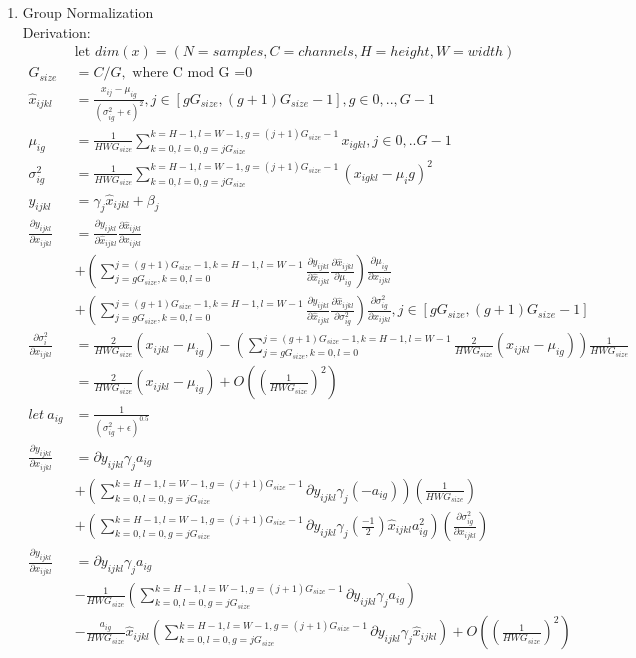 \documentclass[12pt,letter]{article}
\begin{document}
\begin{enumerate}
\item Group Normalization\\
  Derivation:
  \begin{align*}
    &\text{let } dim(x) = (N=samples,C=channels,H=height,W=width)\\
    G_{size} &= C/G, \text{ where C mod G =0}\\
    \hat{x}_{ijkl}&=\frac{x_{ij}-\mu_{ig}}{(\sigma_{ig}^2+\epsilon)^2}, j \in [gG_{size}, (g+1)G_{size}-1], g \in 0,..,G-1\\
    \mu_{ig}&=\frac{1}{HWG_{size}}\sum_{k=0,l=0,g=jG_{size}}^{k=H-1,l=W-1,g=(j+1)G_{size}-1} x_{igkl}, j \in 0,..G-1\\
    \sigma_{ig}^2&=\frac{1}{HWG_{size}}\sum_{k=0,l=0,g=jG_{size}}^{k=H-1,l=W-1,g=(j+1)G_{size}-1} (x_{igkl}-\mu_ig)^2\\
    y_{ijkl}&=\gamma_j \hat{x}_{ijkl} + \beta_j\\
    \frac{\partial y_{ijkl}}{\partial x_{ijkl}}&=\frac{\partial y_{ijkl}}{\partial \hat{x}_{ijkl}} \frac{\partial \hat{x}_{ijkl}}{\partial x_{ijkl}}\\
    & + (\sum_{j=gG_{size},k=0,l=0}^{j=(g+1)G_{size}-1,k=H-1,l=W-1} \frac{\partial y_{ijkl}}{\partial \hat{x}_{ijkl}} \frac{\partial \hat{x}_{ijkl}}{\partial \mu_{ig}} ) \frac{\partial \mu_{ig}}{\partial x_{ijkl}}\\
    & + (\sum_{j=gG_{size},k=0,l=0}^{j=(g+1)G_{size}-1,k=H-1,l=W-1} \frac{\partial y_{ijkl}}{\partial \hat{x}_{ijkl}} \frac{\partial \hat{x}_{ijkl}}{\partial \sigma_{ig}^2}) \frac{\partial \sigma_{ig}^2}{\partial x_{ijkl}}, j\in[gG_{size}, (g+1)G_{size}-1]\\
    \frac{\partial \sigma_i^2}{\partial x_{ijkl}} &= \frac{2}{HWG_{size}}(x_{ijkl}-\mu_{ig}) - (\sum_{j=gG_{size},k=0,l=0}^{j=(g+1)G_{size}-1,k=H-1,l=W-1} \frac{2}{HWG_{size}}(x_{ijkl}-\mu_{ig}))\frac{1}{HWG_{size}}\\
    &=\frac{2}{HWG_{size}}(x_{ijkl}-\mu_{ig}) + O((\frac{1}{HWG_{size}})^2)\\
    let\ a_{ig}&= \frac{1}{(\sigma_{ig}^2+\epsilon)^{0.5}}\\
    \frac{\partial y_{ijkl}}{\partial x_{ijkl}}&= \partial y_{ijkl} \gamma_j a_{ig}\\
    & + (\sum_{k=0,l=0,g=jG_{size}}^{k=H-1,l=W-1,g=(j+1)G_{size}-1} \partial y_{ijkl} \gamma_j (-a_{ig}))(\frac{1}{HWG_{size}})\\
    & + (\sum_{k=0,l=0,g=jG_{size}}^{k=H-1,l=W-1,g=(j+1)G_{size}-1} \partial y_{ijkl} \gamma_j (\frac{-1}{2}) \hat{x}_{ijkl} a_{ig}^2)(\frac{\partial \sigma_{ig}^2}{\partial x_{ijkl}})\\
    \frac{\partial y_{ijkl}}{\partial x_{ijkl}}&= \partial y_{ijkl} \gamma_j a_{ig}\\
    &- \frac{1}{HWG_{size}} (\sum_{k=0,l=0,g=jG_{size}}^{k=H-1,l=W-1,g=(j+1)G_{size}-1} \partial y_{ijkl} \gamma_j a_{ig})\\
    &- \frac{a_{ig}}{HWG_{size}}\hat{x}_{ijkl}(\sum_{k=0,l=0,g=jG_{size}}^{k=H-1,l=W-1,g=(j+1)G_{size}-1} \partial y_{ijkl} \gamma_j \hat{x}_{ijkl}) + O((\frac{1}{HWG_{size}})^2)
  \end{align*}
    

\end{enumerate}
\end{document}
